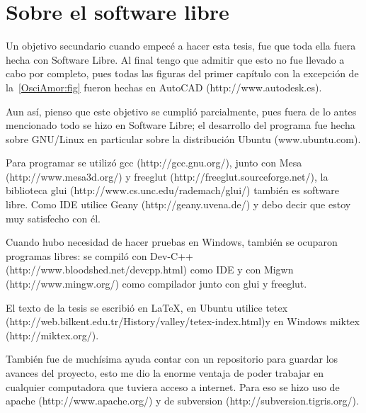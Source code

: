\chapter{Sobre el software libre}
Un objetivo secundario cuando empecé a hacer esta tesis, fue que toda ella fuera hecha con Software Libre. Al final tengo que admitir que esto no fue llevado a cabo por completo, pues todas las figuras del primer capítulo con la excepción de la~\ref{OsciAmor:fig} fueron hechas en AutoCAD (http://www.autodesk.es).

Aun así, pienso que este objetivo se cumplió parcialmente, pues fuera de lo antes mencionado todo se hizo en Software Libre; el desarrollo del programa fue hecha sobre GNU/Linux en particular sobre la distribución Ubuntu (www.ubuntu.com).

Para programar se utilizó gcc (http://gcc.gnu.org/), junto con Mesa (http://www.mesa3d.org/) y freeglut (http://freeglut.sourceforge.net/), la biblioteca glui (http://www.cs.unc.edu/rademach/glui/) también es software libre. Como IDE utilice Geany (http://geany.uvena.de/) y debo decir que estoy muy satisfecho con él.

Cuando hubo necesidad de hacer pruebas en Windows, también se ocuparon programas libres: se compiló con Dev-C++ (http://www.bloodshed.net/devcpp.html) como IDE y con Migwn (http://www.mingw.org/) como compilador junto con glui y freeglut.

El texto de la tesis se escribió en \LaTeX, en Ubuntu utilice tetex (http://web.bilkent.edu.tr/History/valley/tetex-index.html)y en Windows miktex (http://miktex.org/).

También fue de muchísima ayuda contar con un repositorio para guardar los avances del proyecto, esto me dio la enorme ventaja de poder trabajar en cualquier computadora que tuviera acceso a internet. Para eso se hizo uso de apache (http://www.apache.org/) y de subversion (http://subversion.tigris.org/).
